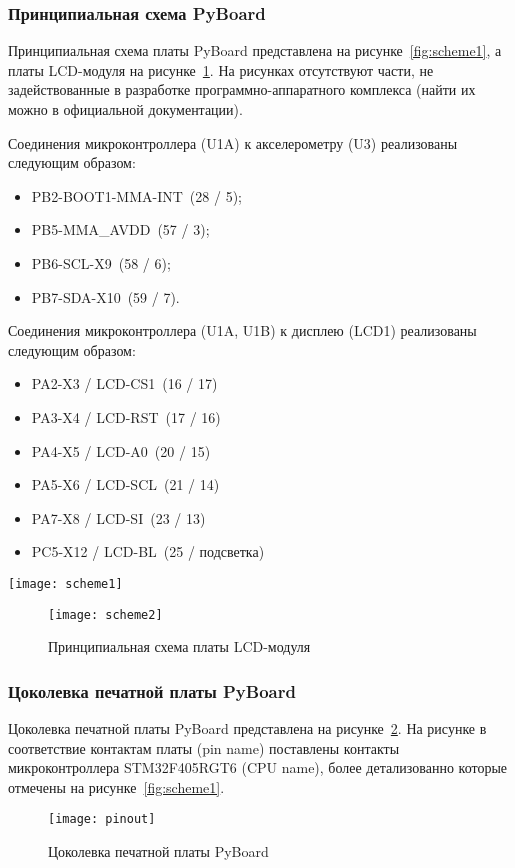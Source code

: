 \documentclass[document.tex]{subfiles}
\begin{document}
\clearpage
\subsubsection{Принципиальная схема PyBoard}
Принципиальная схема платы PyBoard представлена на рисунке~\ref{fig:scheme1}, а платы LCD-модуля на рисунке~\ref{fig:scheme2}. На рисунках отсутствуют части, не задействованные в
разработке программно-аппаратного комплекса (найти их можно в официальной документации).

Соединения микроконтроллера (U1A) к акселерометру (U3) реализованы следующим образом:
\begin{itemize}
	\item PB2-BOOT1-MMA-INT~(28 / 5);
	\item PB5-MMA\_AVDD~(57 / 3);
	\item PB6-SCL-X9~(58 / 6);
	\item PB7-SDA-X10~(59 / 7).
\end{itemize}

Соединения микроконтроллера (U1A, U1B) к дисплею (LCD1) реализованы следующим образом:
\begin{itemize}
	\item PA2-X3 / LCD-CS1~(16 / 17)
	\item PA3-X4 / LCD-RST~(17 / 16)
	\item PA4-X5 / LCD-A0~(20 / 15)
	\item PA5-X6 / LCD-SCL~(21 / 14)
	\item PA7-X8 / LCD-SI~(23 / 13)
	\item PC5-X12 / LCD-BL~(25 / подсветка)
\end{itemize}

\begin{sidewaysfigure}
\centering
\texttt{[image: scheme1]}
\caption{Принципиальная схема PyBoard}
\label{fig:scheme1}
\end{sidewaysfigure}

\begin{figure}
\centering
\texttt{[image: scheme2]}
\caption{Принципиальная схема платы LCD-модуля}
\label{fig:scheme2}
\end{figure}

\clearpage
\subsubsection{Цоколевка печатной платы PyBoard}
Цоколевка печатной платы PyBoard представлена на рисунке~\ref{fig:pinout}. На рисунке в соответ\-ствие контактам платы (pin name) поставлены контакты микроконтроллера STM32F405RGT6
(CPU name), более детализованно которые отмечены на рисунке~\ref{fig:scheme1}.
\begin{figure}[h]
\centering
\texttt{[image: pinout]}
\caption{Цоколевка печатной платы PyBoard}
\label{fig:pinout}
\end{figure}
\end{document}
